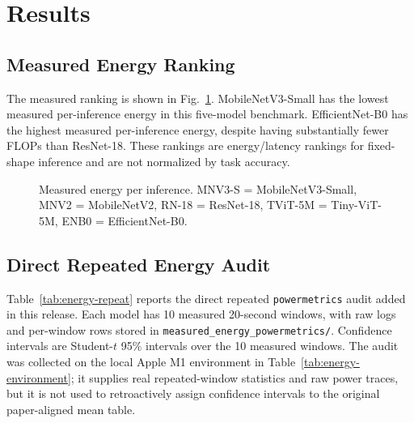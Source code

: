 \documentclass[conference]{IEEEtran}
\begin{document}
\section{Results}

\subsection{Measured Energy Ranking}
The measured ranking is shown in Fig.~\ref{fig:measured-energy}.
MobileNetV3-Small has the lowest measured per-inference energy in this
five-model benchmark. EfficientNet-B0 has the highest measured per-inference
energy, despite having substantially fewer FLOPs than ResNet-18. These
rankings are energy/latency rankings for fixed-shape inference and are not
normalized by task accuracy.

\begin{figure}[ht]
\centering
{}
\caption{Measured energy per inference. MNV3-S = MobileNetV3-Small, MNV2 = MobileNetV2, RN-18 = ResNet-18, TViT-5M = Tiny-ViT-5M, ENB0 = EfficientNet-B0.}
\label{fig:measured-energy}
\end{figure}

\subsection{Direct Repeated Energy Audit}
Table~\ref{tab:energy-repeat} reports the direct repeated
\texttt{powermetrics} audit added in this release. Each model has 10 measured
20-second windows, with raw logs and per-window rows stored in
\texttt{measured\_energy\_powermetrics/}. Confidence intervals are
Student-$t$ 95\% intervals over the 10 measured windows. The audit was
collected on the local Apple M1 environment in
Table~\ref{tab:energy-environment}; it supplies real repeated-window
statistics and raw power traces, but it is not used to retroactively assign
confidence intervals to the original paper-aligned mean table.
\end{document}
